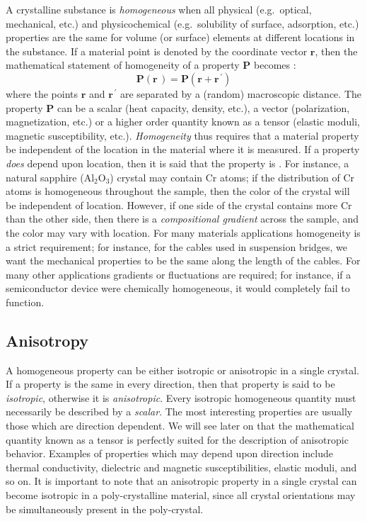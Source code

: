 A crystalline substance is \textit{homogeneous} when all physical (e.g.\ optical, mechanical, etc.)  and physicochemical (e.g.\ solubility of surface, adsorption, etc.)  properties are the same for volume (or surface) elements at different locations in the substance.  If a material point is denoted by the coordinate vector $\mathbf{r}$, then the mathematical statement of homogeneity of a property $\mathbf{P}$ becomes :
\begin{equation}
	\mathbf{P}(\mathbf{r}\,)=\mathbf{P}(\mathbf{r}+\mathbf{r}^{\,\prime})
\end{equation}
where the points $\mathbf{r}$ and $\mathbf{r}^{\,\prime}$ are separated by a (random) macroscopic distance.  The property $\mathbf{P}$ can be a scalar (heat capacity, density, etc.), a vector (polarization, magnetization, etc.)  or a higher order quantity known as a tensor (elastic moduli, magnetic susceptibility, etc.). \textit{Homogeneity} thus requires that a material property be independent of the location in the material where it is measured.  If a property \textit{does} depend upon location, then it is said that the property is .  For instance, a natural sapphire (Al$_2$O$_3$) crystal may contain Cr atoms; if the distribution of Cr atoms is homogeneous throughout the sample, then the color of the crystal will be independent of location.  However, if one side of the crystal contains more Cr than the other side, then there is a \textit{compositional gradient} across the sample, and the color may vary with location.  For many materials applications homogeneity is a strict requirement; for instance, for the cables used in suspension bridges, we want the mechanical properties to be the same along the length of the cables. For many other applications gradients or fluctuations are required;  for instance, if a semiconductor device were chemically homogeneous, it would completely fail to function.


\subsection{Anisotropy}

A homogeneous property can be either isotropic or anisotropic in a single crystal.  If a property is the same in every direction, then that property is said to be \textit{isotropic}, otherwise it is \textit{anisotropic}.  Every isotropic homogeneous quantity must necessarily be described by a \textit{scalar}.  The most interesting properties are usually those which are direction dependent.  We will see later on that the mathematical quantity known as a tensor is perfectly suited for the description of anisotropic behavior.  Examples of properties which may depend upon direction include thermal conductivity, dielectric and magnetic susceptibilities, elastic moduli, and so on.  It is important to note that an anisotropic property in a single crystal can become isotropic in a poly-crystalline material, since all crystal orientations may be simultaneously present in the poly-crystal.

